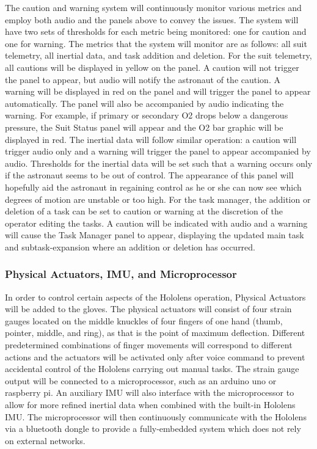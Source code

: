 \documentclass{article}
\let\Oldsubsubsection\subsubsection
\renewcommand{\subsubsection}{\FloatBarrier\Oldsubsubsection}
\begin{document}
The caution and warning system will continuously monitor various metrics and employ both audio and the panels above to convey the issues. The system will have two sets of thresholds for each metric being monitored: one for caution and one for warning. The metrics that the system will monitor are as follows:  all suit telemetry, all inertial data, and task addition and deletion. For the suit telemetry, all cautions will be displayed in yellow on the panel. A caution will not trigger the panel to appear, but audio will notify the astronaut of the caution. A warning will be displayed in red on the panel and will trigger the panel to appear automatically. The panel will also be accompanied by audio indicating the warning. For example, if primary or secondary O2 drops below a dangerous pressure, the Suit Status panel will appear and the O2 bar graphic will be displayed in red. The inertial data will follow similar operation: a caution will trigger audio only and a warning will trigger the panel to appear accompanied by audio. Thresholds for the inertial data will be set such that a warning occurs only if the astronaut seems to be out of control. The appearance of this panel will hopefully aid the astronaut in regaining control as he or she can now see which degrees of motion are unstable or too high. For the task manager, the addition or deletion of a task can be set to caution or warning at the discretion of the operator editing the tasks. A caution will be indicated with audio and a warning will cause the Task Manager panel to appear, displaying the updated main task and subtask-expansion where an addition or deletion has occurred.

\subsubsection{Physical Actuators, IMU, and Microprocessor}

In order to control certain aspects of the Hololens operation, Physical Actuators will be added to the gloves. The physical actuators will consist of four strain gauges located on the middle knuckles of four fingers of one hand (thumb, pointer, middle, and ring), as that is the point of maximum deflection. Different predetermined combinations of finger movements will correspond to different actions and the actuators will be activated only after voice command to prevent accidental control of the Hololens carrying out manual tasks. The strain gauge output will be connected to a microprocessor, such as an arduino uno or raspberry pi. An auxiliary IMU will also interface with the microprocessor to allow for more refined inertial data when combined with the built-in Hololens IMU. The microprocessor will then continuously communicate with the Hololens via a bluetooth dongle to provide a fully-embedded system which does not rely on external networks.
\end{document}
